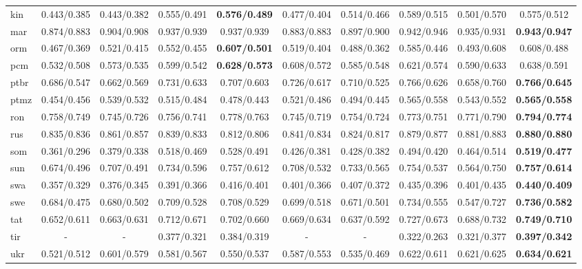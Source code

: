 \documentclass[a4paper,12pt]{extarticle}
\begin{document}
\begin{table}[!th]
\begin{center}
{\begin{tabular}{@{}lccccccccc@{}}
    kin & 0.443/0.385 & 0.443/0.382 & 0.555/0.491 & \textbf{0.576/0.489} & 0.477/0.404 & 0.514/0.466 & 0.589/0.515 & 0.501/0.570 & 0.575/0.512 \\
    mar & 0.874/0.883 & 0.904/0.908 & 0.937/0.939 & 0.937/0.939 & 0.883/0.883 & 0.897/0.900 & 0.942/0.946 & 0.935/0.931 & \textbf{0.943/0.947} \\
    orm & 0.467/0.369 & 0.521/0.415 & 0.552/0.455 & \textbf{0.607/0.501} & 0.519/0.404 & 0.488/0.362 & 0.585/0.446 & 0.493/0.608 & 0.608/0.488 \\
    pcm & 0.532/0.508 & 0.573/0.535 & 0.599/0.542 & \textbf{0.628/0.573} & 0.608/0.572 & 0.585/0.548 & 0.621/0.574 & 0.590/0.633 & 0.638/0.591 \\
    ptbr & 0.686/0.547 & 0.662/0.569 & 0.731/0.633 & 0.707/0.603 & 0.726/0.617 & 0.710/0.525 & 0.766/0.626 & 0.658/0.760 & \textbf{0.766/0.645} \\
    ptmz & 0.454/0.456 & 0.539/0.532 & 0.515/0.484 & 0.478/0.443 & 0.521/0.486 & 0.494/0.445 & 0.565/0.558 & 0.543/0.552 & \textbf{0.565/0.558} \\
    ron & 0.758/0.749 & 0.745/0.726 & 0.756/0.741 & 0.778/0.763 & 0.745/0.719 & 0.754/0.724 & 0.773/0.751 & 0.771/0.790 & \textbf{0.794/0.774} \\
    rus & 0.835/0.836 & 0.861/0.857 & 0.839/0.833 & 0.812/0.806 & 0.841/0.834 & 0.824/0.817 & 0.879/0.877 & 0.881/0.883 & \textbf{0.880/0.880} \\
    som & 0.361/0.296 & 0.379/0.338 & 0.518/0.469 & 0.528/0.491 & 0.426/0.381 & 0.428/0.382 & 0.494/0.420 & 0.464/0.514 & \textbf{0.519/0.477} \\
    sun & 0.674/0.496 & 0.707/0.491 & 0.734/0.596 & 0.757/0.612 & 0.708/0.532 & 0.733/0.565 & 0.754/0.537 & 0.564/0.750 & \textbf{0.757/0.614} \\
    swa & 0.357/0.329 & 0.376/0.345 & 0.391/0.366 & 0.416/0.401 & 0.401/0.366 & 0.407/0.372 & 0.435/0.396 & 0.401/0.435 & \textbf{0.440/0.409} \\
    swe & 0.684/0.475 & 0.680/0.502 & 0.709/0.528 & 0.708/0.529 & 0.699/0.518 & 0.671/0.501 & 0.734/0.555 & 0.547/0.727 & \textbf{0.736/0.582} \\
    tat & 0.652/0.611 & 0.663/0.631 & 0.712/0.671 & 0.702/0.660 & 0.669/0.634 & 0.637/0.592 & 0.727/0.673 & 0.688/0.732 & \textbf{0.749/0.710} \\
    tir & - & - & 0.377/0.321 & 0.384/0.319 & - & - & 0.322/0.263 & 0.321/0.377 & \textbf{0.397/0.342} \\
    ukr & 0.521/0.512 & 0.601/0.579 & 0.581/0.567 & 0.550/0.537 & 0.587/0.553 & 0.535/0.469 & 0.622/0.611 & 0.621/0.625 & \textbf{0.634/0.621} \\

\end{tabular}}
\end{center}
\end{table}
\end{document}

